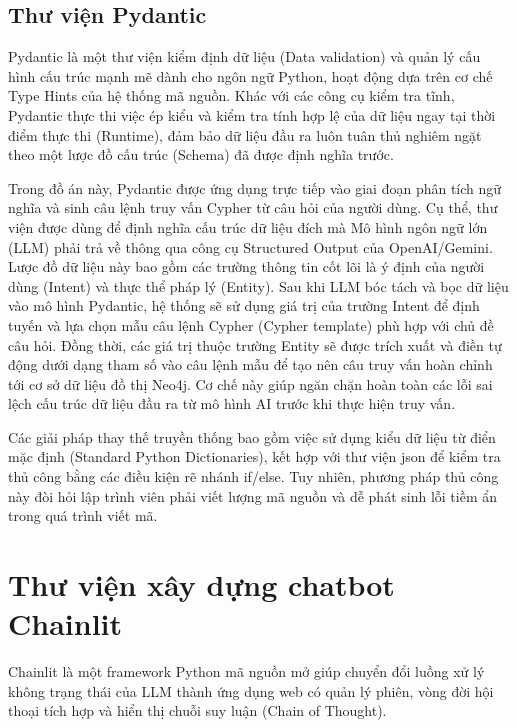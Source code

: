 \documentclass[../DoAn.tex]{subfiles}
\begin{document}
\subsection{Thư viện Pydantic}
\label{subsection:3.3.4}


Pydantic \cite{PydanticDoc} là một thư viện kiểm định dữ liệu (Data validation) và quản lý cấu hình cấu trúc mạnh mẽ dành cho ngôn ngữ Python, hoạt động dựa trên cơ chế Type Hints của hệ thống mã nguồn. Khác với các công cụ kiểm tra tĩnh, Pydantic thực thi việc ép kiểu và kiểm tra tính hợp lệ của dữ liệu ngay tại thời điểm thực thi (Runtime), đảm bảo dữ liệu đầu ra luôn tuân thủ nghiêm ngặt theo một lược đồ cấu trúc (Schema) đã được định nghĩa trước.


Trong đồ án này, Pydantic được ứng dụng trực tiếp vào giai đoạn phân tích ngữ nghĩa và sinh câu lệnh truy vấn Cypher từ câu hỏi của người dùng. Cụ thể, thư viện được dùng để định nghĩa cấu trúc dữ liệu đích mà Mô hình ngôn ngữ lớn (LLM) phải trả về thông qua công cụ Structured Output của OpenAI/Gemini. Lược đồ dữ liệu này bao gồm các trường thông tin cốt lõi là ý định của người dùng (Intent) và thực thể pháp lý (Entity). Sau khi LLM bóc tách và bọc dữ liệu vào mô hình Pydantic, hệ thống sẽ sử dụng giá trị của trường Intent để định tuyến và lựa chọn mẫu câu lệnh Cypher (Cypher template) phù hợp với chủ đề câu hỏi. Đồng thời, các giá trị thuộc trường Entity sẽ được trích xuất và điền tự động dưới dạng tham số vào câu lệnh mẫu để tạo nên câu truy vấn hoàn chỉnh tới cơ sở dữ liệu đồ thị Neo4j. Cơ chế này giúp ngăn chặn hoàn toàn các lỗi sai lệch cấu trúc dữ liệu đầu ra từ mô hình AI trước khi thực hiện truy vấn.  


Các giải pháp thay thế truyền thống bao gồm việc sử dụng kiểu dữ liệu từ điển mặc định (Standard Python Dictionaries), kết hợp với thư viện json để kiểm tra thủ công bằng các điều kiện rẽ nhánh if/else. Tuy nhiên, phương pháp thủ công này đòi hỏi lập trình viên phải viết lượng mã nguồn và dễ phát sinh lỗi tiềm ẩn trong quá trình viết mã.


\section{Thư viện xây dựng chatbot Chainlit}
\label{section:3.4}


Chainlit \cite{ChainlitDoc} là một framework Python mã nguồn mở giúp chuyển đổi luồng xử lý không trạng thái của LLM thành ứng dụng web có quản lý phiên, vòng đời hội thoại tích hợp và hiển thị chuỗi suy luận (Chain of Thought).
\end{document}
